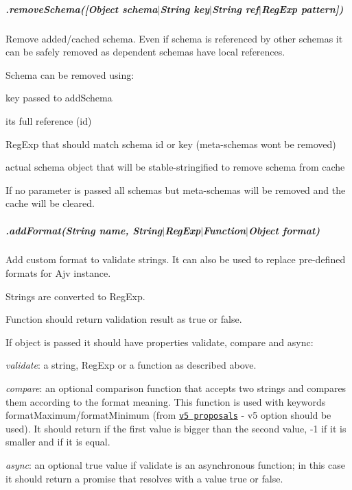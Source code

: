 \subparagraph*{.remove\+Schema(\mbox{[}Object schema$\vert$\+String key$\vert$\+String ref$\vert$\+Reg\+Exp pattern\mbox{]})}

Remove added/cached schema. Even if schema is referenced by other schemas it can be safely removed as dependent schemas have local references.

Schema can be removed using\+:
\begin{DoxyItemize}
\item key passed to {\ttfamily add\+Schema}
\item it\textquotesingle{}s full reference (id)
\item Reg\+Exp that should match schema id or key (meta-\/schemas won\textquotesingle{}t be removed)
\item actual schema object that will be stable-\/stringified to remove schema from cache
\end{DoxyItemize}

If no parameter is passed all schemas but meta-\/schemas will be removed and the cache will be cleared.

\subparagraph*{\label{_api-addformat}%
.add\+Format(String name, String$\vert$\+Reg\+Exp$\vert$\+Function$\vert$\+Object format)}

Add custom format to validate strings. It can also be used to replace pre-\/defined formats for Ajv instance.

Strings are converted to Reg\+Exp.

Function should return validation result as {\ttfamily true} or {\ttfamily false}.

If object is passed it should have properties {\ttfamily validate}, {\ttfamily compare} and {\ttfamily async}\+:


\begin{DoxyItemize}
\item {\itshape validate}\+: a string, Reg\+Exp or a function as described above.
\item {\itshape compare}\+: an optional comparison function that accepts two strings and compares them according to the format meaning. This function is used with keywords {\ttfamily format\+Maximum}/{\ttfamily format\+Minimum} (from \href{https://github.com/json-schema/json-schema/wiki/v5-Proposals}{\tt v5 proposals} -\/ {\ttfamily v5} option should be used). It should return {} if the first value is bigger than the second value, {\ttfamily -\/1} if it is smaller and {} if it is equal.
\item {\itshape async}\+: an optional {\ttfamily true} value if {\ttfamily validate} is an asynchronous function; in this case it should return a promise that resolves with a value {\ttfamily true} or {\ttfamily false}.
\end{DoxyItemize}

